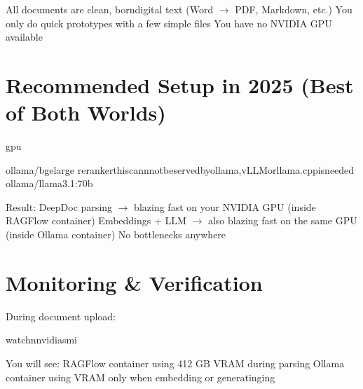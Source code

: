 \documentclass[letterpaper,10pt,english]{sphinxmanual}
\begin{document}
\sphinxAtStartPar
{}
\sphinxhyphen{} All documents are clean, born\sphinxhyphen{}digital text (Word \(\rightarrow\) PDF, Markdown, etc.)
\sphinxhyphen{} You only do quick prototypes with a few simple files
\sphinxhyphen{} You have no NVIDIA GPU available


\section{Recommended Setup in 2025 (Best of Both Worlds)}
\label{\detokenize{ragflow-gpu-cpu:recommended-setup-in-2025-best-of-both-worlds}}
\begin{sphinxVerbatim}[commandchars=\\\{\}]
gpu

ollama/bge\PYGZhy{}large
rerankerthiscannnotbeservedbyollama,vLLMorllama.cppisneeded
ollama/llama3.1:70b
\end{sphinxVerbatim}

\sphinxAtStartPar
Result:
\sphinxhyphen{} DeepDoc parsing \(\rightarrow\) blazing fast on your NVIDIA GPU (inside RAGFlow container)
\sphinxhyphen{} Embeddings + LLM \(\rightarrow\) also blazing fast on the same GPU (inside Ollama container)
\sphinxhyphen{} No bottlenecks anywhere


\section{Monitoring \& Verification}
\label{\detokenize{ragflow-gpu-cpu:monitoring-verification}}
\sphinxAtStartPar
During document upload:

\begin{sphinxVerbatim}[commandchars=\\\{\}]
watch\PYGZhy{}nnvidia\PYGZhy{}smi
\end{sphinxVerbatim}

\sphinxAtStartPar
You will see:
\sphinxhyphen{} RAGFlow container using 4\textendash{}12 GB VRAM during parsing
\sphinxhyphen{} Ollama container using VRAM only when embedding or generatinging
\end{document}
